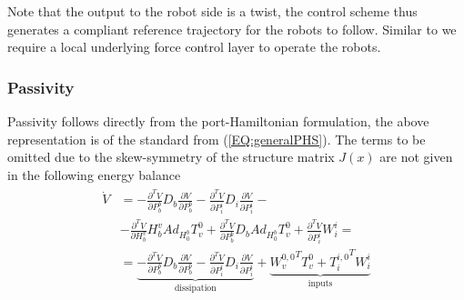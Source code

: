 \documentclass[a4paper,twoside, openright,12pt]{report}
\begin{document}
Note that the output to the robot side is a twist, the control scheme thus generates a compliant reference trajectory for the robots to follow. Similar to \cite{Caccavale_08} we require a local underlying force control layer to operate the robots.
\subsubsection{Passivity}
Passivity follows directly from the port-Hamiltonian formulation, the above representation is of the standard from (\ref{EQ:generalPHS}). The terms to be omitted due to the skew-symmetry of the structure matrix $J(x)$ are not given in the following energy balance
\begin{eqnarray}
\begin{aligned}
\dot{V} &= -\frac{\partial^T V}{\partial P_b^b}D_b\frac{\partial V}{\partial P_b^b} - \frac{\partial^T V}{\partial P_i^i}D_i\frac{\partial V}{\partial P_i^i} -\\ &- \frac{\partial^T V}{\partial H_b^v}H_b^v Ad_{H_0^b}T_v^0 +\frac{\partial^T V}{\partial P_b^b}D_b Ad_{H_0^b}T_v^0 + \frac{\partial^T V}{\partial P_i^i}W_i^i = \\
&= \underbrace{-\frac{\partial^T V}{\partial P_b^b}D_b\frac{\partial V}{\partial P_b^b} - \frac{\partial^T V}{\partial P_i^i}D_i\frac{\partial V}{\partial P_i^i}}_{\text{dissipation}} + \underbrace{{W_v^{0,0}}^T T_v^0 + {T_i^{i,0}}^T W_i^i}_{\text{inputs}}
\end{aligned}
\end{eqnarray}
\end{document}
